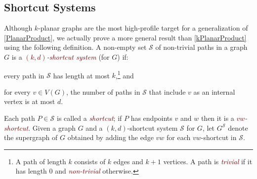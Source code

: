 \documentclass{patmorin}
\theoremstyle{plain}
\theoremstyle{definition}
\newcommand{\defin}[1]{\textcolor{Maroon}{\emph{#1}}}
\newcommand{\note}[2]{\noindent{\color{red}[#1:~#2]}}
\newcommand{\referee}[2]{\noindent\textcolor{blue}{\framebox{\begin{minipage}{\textwidth} Ref \#{#1}: #2\end{minipage}}}}
\renewcommand{\SS}{\mathcal{S}}
\begin{document}
%
%

%
%
%

\subsection{Shortcut Systems}

Although $k$-planar graphs are the most high-profile target for a generalization of \cref{PlanarProduct}, we actually prove a more general result than \cref{kPlanarProduct} using the following definition. A non-empty set $\SS$ of non-trivial paths in a graph $G$ is a \defin{$(k,d)$-shortcut system} (for $G$) if:

\begin{compactitem}
\item every path in $\SS$ has length at most $k$,\footnote{A path of length $k$ consists of $k$ edges and $k+1$ vertices.  A path is \defin{trivial} if it has length 0 and \defin{non-trivial} otherwise.} and
\item for every $v\in V(G)$, the number of paths in $\SS$ that include $v$ as an internal vertex is at most $d$.
\end{compactitem}
Each path $P\in\SS$ is called a \defin{shortcut}; if $P$ has endpoints $v$ and $w$ then it is a \defin{$vw$-shortcut}. Given a graph $G$ and a $(k,d)$-shortcut system $\SS$ for $G$, let $G^{\SS}$ denote the supergraph of $G$ obtained by adding the edge $vw$ for each $vw$-shortcut in $\SS$.
\end{document}
